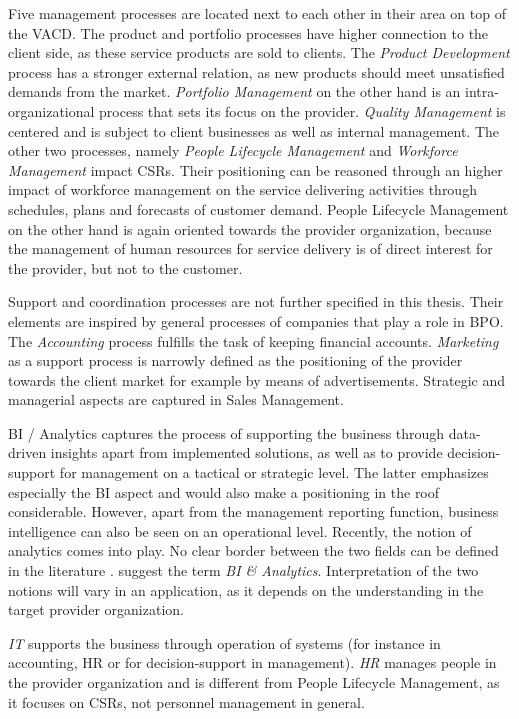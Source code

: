	 Five management processes are located next to each other in their area on top of the \acrshort{VACD}. The product and portfolio processes have higher connection to the client side, as these service products are sold to clients. The \textit{Product Development} process has a stronger external relation, as new products should meet unsatisfied demands from the market. \textit{Portfolio Management} on the other hand is an intra-organizational process that sets its focus on the provider. \textit{Quality Management} is centered and is subject to client businesses as well as internal management. The other two processes, namely \textit{People Lifecycle Management} and \textit{Workforce Management} impact \acrshort{CSR}s. Their positioning can be reasoned through an higher impact of workforce management on the service delivering activities through schedules, plans and forecasts of customer demand. People Lifecycle Management on the other hand is again oriented towards the provider organization, because the management of human resources for service delivery is of direct interest for the provider, but not to the customer.
	 
	 Support and coordination processes are not further specified in this thesis. Their elements are inspired by general processes of companies that play a role in \acrshort{BPO}. The \textit{Accounting} process fulfills the task of keeping financial accounts. \textit{Marketing} as a support process is narrowly defined as the positioning of the provider towards the client market for example by means of advertisements. Strategic and managerial aspects are captured in Sales Management. 
	 
	  \acrfull{BI} / Analytics captures the process of supporting the business through data-driven insights apart from implemented solutions, as well as to provide decision-support for management on a tactical or strategic level. The latter emphasizes especially the  \acrshort{BI} aspect and would also make a positioning in the roof considerable. However, apart from the management reporting function, business intelligence can also be seen on an operational level. Recently, the notion of analytics comes into play. No clear border between the two fields can be defined in the literature \citep{mertens}. \cite{Chen:2012:BIA} suggest the term \textit{\acrshort{BI} \& Analytics}. Interpretation of the two notions will vary in an application, as it depends on the understanding in the target provider organization. 
	  
	  \textit{IT} supports the business through operation of systems (for instance in accounting, HR or for decision-support in management). \textit{HR} manages people in the provider organization and is different from People Lifecycle Management, as it focuses on \acrshort{CSR}s, not personnel management in general. 
	  
